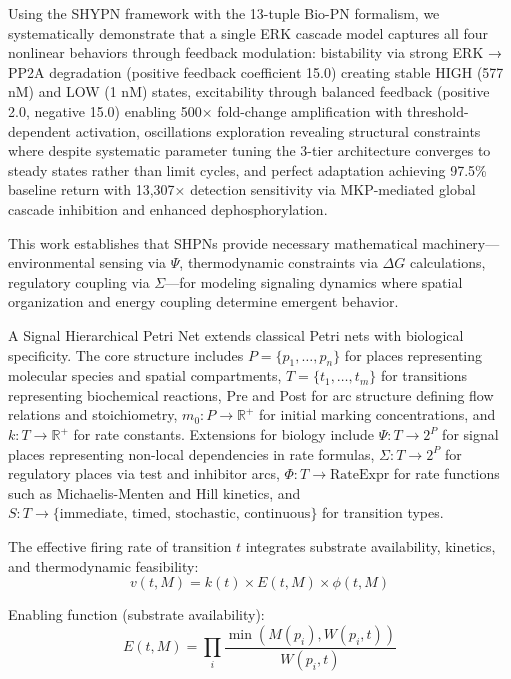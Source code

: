 \documentclass[twocolumn,11pt]{article}
\begin{document}
Using the SHYPN framework with the 13-tuple Bio-PN formalism, we systematically demonstrate that a single ERK cascade model captures all four nonlinear behaviors through feedback modulation: bistability via strong ERK → PP2A degradation (positive feedback coefficient 15.0) creating stable HIGH (577 nM) and LOW (1 nM) states, excitability through balanced feedback (positive 2.0, negative 15.0) enabling 500× fold-change amplification with threshold-dependent activation, oscillations exploration revealing structural constraints where despite systematic parameter tuning the 3-tier architecture converges to steady states rather than limit cycles, and perfect adaptation achieving 97.5\% baseline return with 13,307× detection sensitivity via MKP-mediated global cascade inhibition and enhanced dephosphorylation.


This work establishes that SHPNs provide necessary mathematical machinery—environmental sensing via $\Psi$, thermodynamic constraints via $\Delta G$ calculations, regulatory coupling via $\Sigma$—for modeling signaling dynamics where spatial organization and energy coupling determine emergent behavior.

A Signal Hierarchical Petri Net extends classical Petri nets with biological specificity. The core structure includes $P = \{p_1, \ldots, p_n\}$ for places representing molecular species and spatial compartments, $T = \{t_1, \ldots, t_m\}$ for transitions representing biochemical reactions, Pre and Post for arc structure defining flow relations and stoichiometry, $m_0: P \to \mathbb{R}^+$ for initial marking concentrations, and $k: T \to \mathbb{R}^+$ for rate constants. Extensions for biology include $\Psi: T \to 2^P$ for signal places representing non-local dependencies in rate formulas, $\Sigma: T \to 2^P$ for regulatory places via test and inhibitor arcs, $\Phi: T \to \text{RateExpr}$ for rate functions such as Michaelis-Menten and Hill kinetics, and $S: T \to \{\text{immediate, timed, stochastic, continuous}\}$ for transition types.

The effective firing rate of transition $t$ integrates substrate availability, kinetics, and thermodynamic feasibility:
\begin{equation}
v(t, M) = k(t) \times E(t, M) \times \phi(t, M)
\end{equation}

Enabling function (substrate availability):
\begin{equation}
E(t, M) = \prod_{i} \frac{\min(M(p_i), W(p_i,t))}{W(p_i,t)}
\end{equation}
\end{document}
